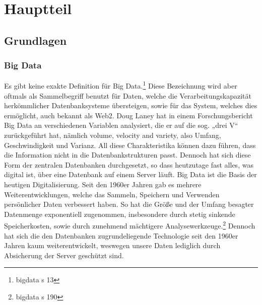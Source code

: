 \newpage
\chapter{Hauptteil}

\section{Grundlagen}

\subsection{Big Data}
Es gibt keine exakte Definition für Big Data.\footnote{bigdata s 13} Diese Bezeichnung wird aber oftmals als Sammelbegriff benutzt für Daten, welche die Verarbeitungskapazität herkömmlicher Datenbanksysteme übersteigen, sowie für das System, welches dies ermöglicht, auch bekannt als Web2.
Doug Laney hat in einem Forschungsbericht Big Data an verschiedenen Variablen analysiert, die er auf die sog. „drei V“ zurückgeführt hat, nämlich volume, velocity and variety, also Umfang, Geschwindigkeit und Varianz. All diese Charakteristika können dazu führen, dass die Information nicht in die Datenbankstrukturen passt.
Dennoch hat sich diese Form der zentralen Datenbanken durchgesetzt, so dass heutzutage fast alles, was digital ist, über eine Datenbank auf einem Server läuft.
Big Data ist die Basis der heutigen Digitalisierung. Seit den 1960er Jahren gab es mehrere Weiterentwicklungen, welche das Sammeln, Speichern und Verwenden persönlicher Daten verbessert haben. So hat die Größe und der Umfang besagter Datenmenge exponentiell zugenommen, insbesondere durch stetig sinkende Speicherkosten, sowie durch zunehmend mächtigere Analysewerkzeuge.\footnote{bigdata s 190}
Dennoch hat sich die den Datenbanken zugrundeliegende Technologie seit den 1960er Jahren kaum weiterentwickelt, weswegen unsere Daten lediglich durch Absicherung der Server geschützt sind.


